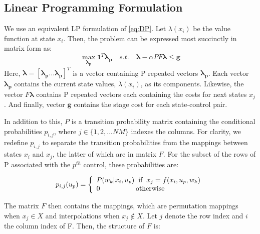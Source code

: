 \documentclass[conference]{IEEEtran}
\begin{document}
\subsection{Linear Programming Formulation}
We use an equivalent LP formulation of \eqref{eq:DP}. Let $\lambda(x_{i})$ be the value function at state $x_{i}$. Then, the problem can be expressed most succinctly in matrix form as:
\begin{equation} \label{eq:prelimLPmtx}
    \max_{\boldsymbol{\lambda_{p}}} \boldsymbol{1}^{T} \boldsymbol{\lambda_{p}}
    \hspace{1em}s.t.\hspace{1em}
    \boldsymbol{\lambda}-\alpha PF\boldsymbol{\lambda} \leq \boldsymbol{g}
\end{equation} Here, $\boldsymbol{\lambda} = [\boldsymbol{\lambda_{p}}\hdots \boldsymbol{\lambda_{p}}]^{T}$ is a vector containing P repeated vectors $\boldsymbol{\lambda_{p}}$. Each vector $\boldsymbol{\lambda_{p}}$ contains the current state values, $\lambda(x_{i})$, as its components. Likewise, the vector $F\boldsymbol{\lambda}$ contains P repeated vectors each containing the costs for next states $x_{j}$. And finally, vector $\boldsymbol{g}$ contains the stage cost for each state-control pair. 

In addition to this, $P$ is a transition probability matrix containing the conditional probabilities $p_{i,j}$, where $j\in \{1,2,...NM\}$ indexes the columns. For clarity, we redefine $p_{i,j}$ to separate the transition probabilities from the mappings between states $x_{i}$ and $x_{j}$, the latter of which are in matrix $F$. For the subset of the rows of P associated with the $p^{th}$ control, these probabilities are:

\begin{equation} \label{eq:TransProb}
p_{i,j}(u_{p})=
\left\{
\begin{array}{l}
P(w_{k}|x_{i},u_{p}) \hspace{0.2cm} \text{if} \hspace{0.2cm} x_{j}=f(x_{i},u_{p},w_{k})\\
0 \hspace{1.8cm} \text{otherwise}
\end{array}
\right.
\end{equation}

The matrix $F$ then contains the mappings, which are permutation mappings when $x_{j}\in X$ and interpolations when $x_{j}\not\in X$. Let $j$ denote the row index and $i$ the column index of F. Then, the structure of $F$ is:
\end{document}
